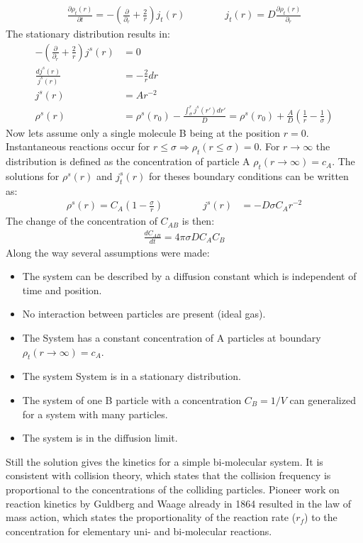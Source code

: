 \documentclass[
  a4paper,BCOR10mm,oneside,
  headsepline,footsepline,%
  fleqn,openbib
]{scrbook}
\begin{document}
\begin{align} \label{smoluchwoskionedimension}
\frac{\partial \rho_t(r)}{\partial t}=-\left(\frac{\partial}{\partial_r}+\frac{2}{r} \right) j_t(r) \qquad \qquad j_t(r)=D \frac{\partial\rho_t(r)}{\partial_r}
\end{align}
 The stationary distribution results in:
\begin{align}
 -\left(\frac{\partial}{\partial_r}+\frac{2}{r} \right) j^{s}(r)&= 0\\
 \frac{d j^{s}(r)}{j^{s}(r)}  &=- \frac{2}{r} dr\\
 j^{s}(r)&=A r^{-2}\\
 \rho^s(r)&=\rho^s(r_0)- \frac{\int_{\sigma}^{r} j^{s}(r')dr'}{D}=\rho^s(r_0)+\frac{A}{D}\left(\frac{1}{r}-\frac{1}{\sigma}\right)
\end{align}
Now lets assume only a single molecule B being at the position $r=0$. Instantaneous reactions occur for $r\leq \sigma \Rightarrow \rho_t(r \leq \sigma)=0$. For $r \rightarrow \infty$ the distribution is defined as the concentration of particle A $\rho_t(r \rightarrow \infty)=c_A$.
The solutions for $\rho^{s}(r)$ and $j^{s}_t(r)$ for theses boundary conditions can be written as:
\begin{align}
 \rho^{s}(r)=C_A \left(1-\frac{\sigma}{r}\right) \qquad \qquad j^{s}(r)&=-D \sigma C_A r^{-2}
 \label{smoluchwoskiproblem}
\end{align}
The change of the concentration of $C_{AB}$ is then: 
\begin{align}
 \frac{d C_{AB} }{dt}=4 \pi \sigma D C_A C_B \label{difkinetics}
\end{align}
Along the way several assumptions were made:
\begin{itemize}
  \item The system can be described by a diffusion constant which is independent of time and position. 
  \item No interaction between particles are present (ideal gas).
  \item The System has a constant concentration of A particles at boundary $\rho_t(r \rightarrow \infty)=c_A$.
  \item The system System is in a stationary distribution.
  \item The system of one B particle with a concentration $C_B=1/V$ can generalized for a system with many particles. 
  \item The system is in the diffusion limit.
\end{itemize}
Still the solution gives the kinetics for a simple bi-molecular system. It is consistent with collision theory, which states that the collision frequency is proportional to the concentrations of the colliding particles. Pioneer work on reaction kinetics by Guldberg and Waage already in 1864 \cite{Waage1986} resulted in the law of mass action, which states the proportionality of the reaction rate ($r_f$) to the concentration for elementary uni- and bi-molecular reactions.
\end{document}
